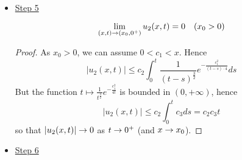 \begin{itemize}
\begin{PropBox}
\begin{Proposition}
\begin{equation*}
                (\partial_t - \partial_{xx})u_2(x,t) = 0 \quad (x > 0, t > 0)
            \end{equation*}
        \end{Proposition}
    \end{PropBox}
    \begin{ProofBox}
        \begin{proof}
            \begin{align*}
                \partial_t u_2(x,t) - \partial_{xx}u_2(x,t) &= -2 \int_0^t \partial_t \Gamma_x(x,t-s) g(s) ds - (-2) \int_0^t \partial_{xx} \Gamma_x(x,t-s)g(s) ds \\
                &= -2 \int_0^t (\partial_t - \partial_{xx})\Gamma_x(x,t-s) g(s) ds = 0
            \end{align*}
        \end{proof}
    \end{ProofBox}
    \item \underline{Step 5}
    \begin{PropBox}
        \begin{Proposition}
            \begin{equation*}
                \lim_{(x,t) \rightarrow (x_0,0^+)} u_2(x,t) = 0 \quad (x_0 > 0)
            \end{equation*}
        \end{Proposition}
    \end{PropBox}
    \begin{ProofBox}
        \begin{proof}
            As $x_0 > 0$, we can assume $0 < c_1 < x$. Hence
            \begin{equation*}
                |u_2(x,t)| \leq c_2 \int_0^t \frac{1}{(t-s)^\frac{3}{2}} e^{-\frac{c_1^2}{(t-s) \cdot 4}}ds
            \end{equation*}
            But the function $t \mapsto \frac{1}{t^\frac{3}{2}} e^{-\frac{c^2_1}{4t}}$ is bounded in $(0,+\infty)$, hence
            \begin{equation*}
                |u_2(x,t)| \leq c_2 \int_0^t c_3 ds = c_2 c_3 t
            \end{equation*}
            so that $|u_2(x,t)| \rightarrow 0$ as $ t \rightarrow 0^+$ (and $x \rightarrow x_0$). 
        \end{proof}
    \end{ProofBox}
    \item \underline{Step 6}
    \begin{PropBox}
        \begin{Proposition}

\end{Proposition}
\end{PropBox}
\end{itemize}
